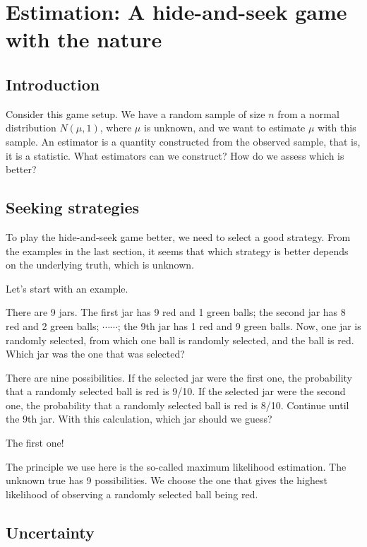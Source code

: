 \hypertarget{ch:estimation}{%
\chapter{Estimation: A hide-and-seek game with the nature}\label{ch:estimation}}


\section{Introduction}
Consider this game setup. We have a random sample of size \(n\) from a normal
distribution \(N(\mu, 1)\), where \(\mu\) is unknown, and we want to estimate \(\mu\)
with this sample. An estimator is a quantity constructed from the observed
sample, that is, it is a statistic. What estimators can we construct? How do we
assess which is better?



\section{Seeking strategies}

To play the hide-and-seek game better, we need to select a good strategy. From
the examples in the last section, it seems that which strategy is better depends
on the underlying truth, which is unknown.


Let's start with an example.
\begin{illustration}
\label{example:has-jars}
There are 9 jars. The first jar has 9 red and 1 green balls; the second jar has
8 red and 2 green balls; $\cdots\cdots$; the 9th jar has 1 red and 9 green
balls. Now, one jar is randomly selected, from which one ball is randomly
selected, and the ball is red. Which jar was the one that was selected?

There are nine possibilities. If the selected jar were the first one, the
probability that a randomly selected ball is red is 9/10. If the selected jar
were the second one, the probability that a randomly selected ball is red is
8/10. Continue until the 9th jar. With this calculation, which jar should we
guess?

The first one!
\end{illustration}

The principle we use here is the so-called maximum likelihood estimation. The
unknown true has 9 possibilities. We choose the one that gives the highest
likelihood of observing a randomly selected ball being red.

\section{Uncertainty}





